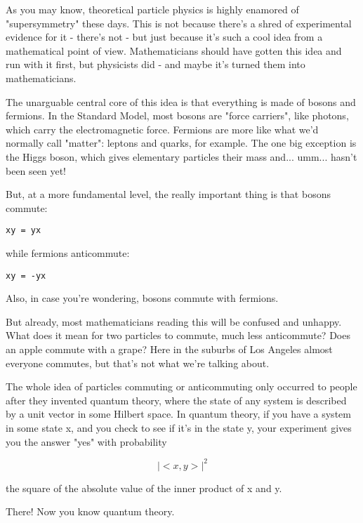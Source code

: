 


As you may know, theoretical particle physics is highly enamored of 
"supersymmetry" these days.  This is not because there's a shred of 
experimental evidence for it - there's not - but just because it's such
a cool idea from a mathematical point of view.  Mathematicians should
have gotten this idea and run with it first, but physicists did - and
maybe it's turned them into mathematicians.

The unarguable central core of this idea is that everything is made of 
bosons and fermions.  In the Standard Model, most bosons are "force 
carriers", like photons, which carry the electromagnetic force.  Fermions 
are more like what we'd normally call "matter": leptons and quarks, 
for example.  The one big exception is the Higgs boson, which gives elementary 
particles their mass and... umm... hasn't been seen yet! 

But, at a more fundamental level, the really important thing is that
bosons commute:

\begin{verbatim}
xy = yx
\end{verbatim}
    
while fermions anticommute:

\begin{verbatim}
xy = -yx
\end{verbatim}
    
Also, in case you're wondering, bosons commute with fermions.

But already, most mathematicians reading this will be confused and unhappy.
What does it mean for two particles to commute, much less anticommute?  
Does an apple commute with a grape?   Here in the suburbs of Los Angeles 
almost everyone commutes, but that's not what we're talking about. 

The whole idea of particles commuting or anticommuting only occurred to 
people after they invented quantum theory, where the state of any 
system is described by a unit vector in some Hilbert space.  In quantum
theory, if you have a system in some state x, and you check to see if
it's in the state y, your experiment gives you the answer "yes" with
probability 

$$
|<x,y>|^{2}
$$
    
the square of the absolute value of the inner product of x and y.

There!  Now you know quantum theory.

